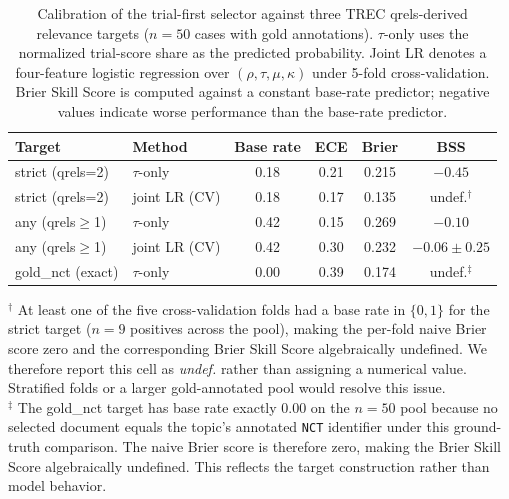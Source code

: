 \documentclass[pdflatex,Numbered]{sn-jnl}
\begin{document}
\begin{table}[!htbp]
\centering
\caption{Calibration of the trial-first selector against three TREC qrels-derived relevance targets ($n{=}50$ cases with gold annotations). $\tau$-only uses the normalized trial-score share as the predicted probability. Joint LR denotes a four-feature logistic regression over $(\rho, \tau, \mu, \kappa)$ under 5-fold cross-validation. Brier Skill Score is computed against a constant base-rate predictor; negative values indicate worse performance than the base-rate predictor.}
\label{tab:calibration}
\small
\setlength{\tabcolsep}{6pt}
\begin{tabular}{l l c c c c}
\toprule
Target & Method & Base rate & ECE & Brier & BSS \\
\midrule
strict (qrels=2)     & $\tau$-only      & 0.18 & 0.21 & 0.215 & $-0.45$ \\
strict (qrels=2)     & joint LR (CV)    & 0.18 & 0.17 & 0.135 & undef.$^\dagger$ \\
any (qrels$\geq$1)   & $\tau$-only      & 0.42 & 0.15 & 0.269 & $-0.10$ \\
any (qrels$\geq$1)   & joint LR (CV)    & 0.42 & 0.30 & 0.232 & $-0.06\pm0.25$ \\
gold\_nct (exact)    & $\tau$-only      & 0.00 & 0.39 & 0.174 & undef.$^\ddagger$ \\
\bottomrule
\end{tabular}

\smallskip
\footnotesize
$^\dagger$ At least one of the five cross-validation folds had a base rate in $\{0, 1\}$ for the strict target ($n=9$ positives across the pool), making the per-fold naive Brier score zero and the corresponding Brier Skill Score algebraically undefined. We therefore report this cell as \emph{undef.} rather than assigning a numerical value. Stratified folds or a larger gold-annotated pool would resolve this issue.\\
$^\ddagger$ The gold\_nct target has base rate exactly $0.00$ on the $n=50$ pool because no selected document equals the topic's annotated \texttt{NCT} identifier under this ground-truth comparison. The naive Brier score is therefore zero, making the Brier Skill Score algebraically undefined. This reflects the target construction rather than model behavior.
\end{table}
\end{document}
